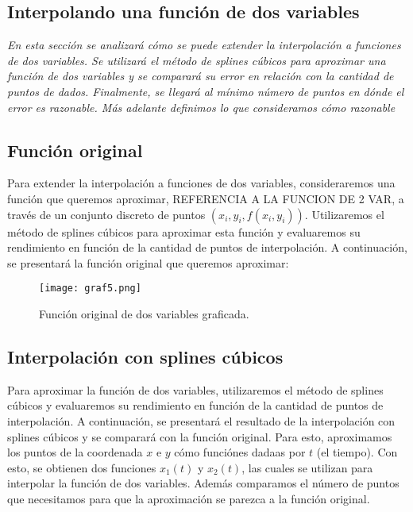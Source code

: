 \documentclass[12pt,a4]{article} %
\begin{document}
\begin{multicols}{2}
\subsection{Interpolando una función de dos variables}

\textit{En esta sección se analizará cómo se puede extender la interpolación a funciones de dos variables. Se utilizará el método de splines cúbicos para aproximar una función de dos variables y se comparará su error en relación con la cantidad de puntos de dados. Finalmente, se llegará al mínimo número de puntos en dónde el error es razonable. Más adelante definimos lo que consideramos cómo razonable}

\subsection{Función original}

Para extender la interpolación a funciones de dos variables, consideraremos una función que queremos aproximar, REFERENCIA A LA FUNCION DE 2 VAR, a través de un conjunto discreto de puntos $(x_i, y_i, f(x_i, y_i))$. Utilizaremos el método de splines cúbicos para aproximar esta función y evaluaremos su rendimiento en función de la cantidad de puntos de interpolación. A continuación, se presentará la función original que queremos aproximar:

\begin{figure}[H] 
    \centering
    \texttt{[image: graf5.png]}
    \caption{Función original de dos variables graficada.}
    \label{graf5}
\end{figure}

\subsection{Interpolación con splines cúbicos}

Para aproximar la función de dos variables, utilizaremos el método de splines cúbicos y evaluaremos su rendimiento en función de la cantidad de puntos de interpolación. A continuación, se presentará el resultado de la interpolación con splines cúbicos y se comparará con la función original. Para esto, aproximamos los puntos de la coordenada $x$ e $y$ cómo funciónes dadaas por $t$ (el tiempo). Con esto, se obtienen dos funciones $x_1(t)$ y $x_2(t)$, las cuales se utilizan para interpolar la función de dos variables. Además comparamos el número de puntos que necesitamos para que la aproximación se parezca a la función original.


\end{multicols}
\end{document}
